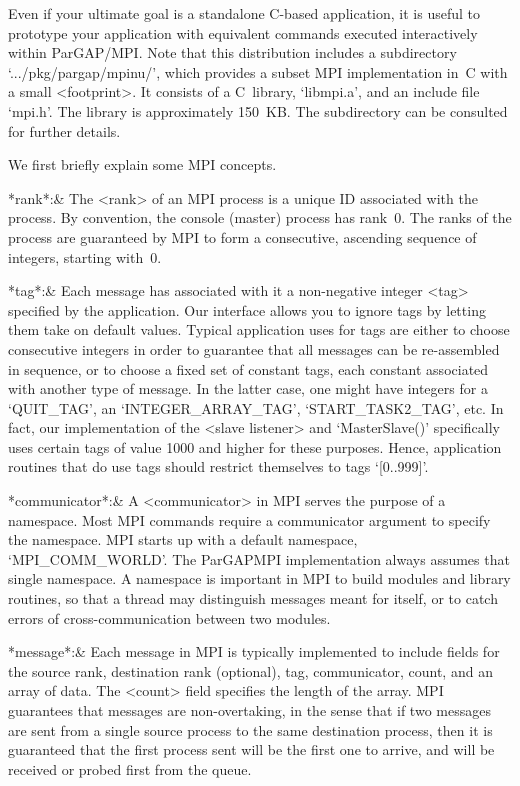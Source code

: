 Even if your ultimate goal is a standalone C-based application, it is
useful to prototype your application with equivalent commands executed
interactively within ParGAP/MPI.  Note that this distribution
includes a subdirectory `.../pkg/pargap/mpinu/', which
provides a subset MPI implementation in~C with a small <footprint>.  It
consists of a C~library, `libmpi.a', and an include file `mpi.h'.  The
library is approximately 150~KB.  The subdirectory can be consulted
for further details.

We first briefly explain some MPI concepts.

\beginitems

*rank*:& The <rank> of an MPI process is a unique ID associated with
the process.  By convention, the console (master) process has rank~0.
The ranks of the process are guaranteed by MPI to form a consecutive,
ascending sequence of integers, starting with~0.

*tag*:& Each message has associated with it a non-negative integer
<tag> specified by the application.  Our interface allows you to
ignore tags by letting them take on default values.  Typical
application uses for tags are either to choose consecutive integers in
order to guarantee that all messages can be re-assembled in sequence,
or to choose a fixed set of constant tags, each constant associated
with another type of message.  In the latter case, one might have
integers for a `QUIT_TAG', an `INTEGER_ARRAY_TAG', `START_TASK2_TAG',
etc.  In fact, our implementation of the <slave listener> and
`MasterSlave()' specifically uses certain tags of value 1000 and
higher for these purposes.  Hence, application routines that do use
tags should restrict themselves to tags `[0..999]'.

*communicator*:& A <communicator> in MPI serves the purpose of a
namespace.  Most MPI commands require a communicator argument to
specify the namespace.  MPI starts up with a default namespace,
`MPI_COMM_WORLD'.  The ParGAPMPI implementation always assumes that
single namespace.  A namespace is important in MPI to build modules
and library routines, so that a thread may distinguish messages meant
for itself, or to catch errors of cross-communication between two modules.

*message*:& Each message in MPI is typically implemented to include
fields for the source rank, destination rank (optional), tag,
communicator, count, and an array of data.  The <count> field
specifies the length of the array.  MPI guarantees that messages are
non-overtaking, in the sense that if two messages are sent from a single
source process to the same destination process, then it is guaranteed
that the first process sent will be the first one to arrive, and will
be received or probed first from the queue.

